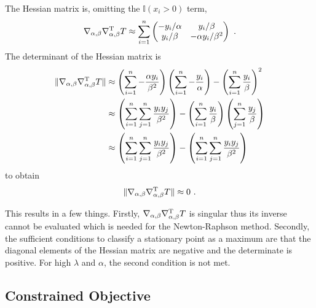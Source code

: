 The Hessian matrix is, omitting the $\mathbb{I}(x_i>0)$ term,
\begin{equation}
  \nabla_{\alpha,\beta}\nabla_{\alpha,\beta}^\textup{T} T \approx
  \sum_{i=1}^n
  \begin{pmatrix}
    -y_i/\alpha  & y_i/\beta \\
    y_i/\beta & -\alpha y_i/\beta^2
  \end{pmatrix}
  \ . 
\end{equation}
The determinant of the Hessian matrix is
\begin{align*}
  \|\nabla_{\alpha,\beta}\nabla_{\alpha,\beta}^\textup{T} T\|
  &\approx
  \left(\sum_{i=1}^n-\frac{\alpha y_i}{\beta^2}\right)
  \left(\sum_{i=1}^n-\frac{y_i}{\alpha}\right) - \left(\sum_{i=1}^n\frac{y_i}{\beta}\right)^2
  \\
  &\approx
  \left(\sum_{i=1}^n\sum_{j=1}^n\frac{y_iy_j}{\beta^2}\right)
   - \left(\sum_{i=1}^n\frac{y_i}{\beta}\right)\left(\sum_{j=1}^n\frac{y_j}{\beta}\right)
  \\
  &\approx
  \left(\sum_{i=1}^n\sum_{j=1}^n\frac{y_iy_j}{\beta^2}\right)
   - \left(\sum_{i=1}^n\sum_{j=1}^n\frac{y_iy_j}{\beta^2}\right)
\end{align*}
to obtain
\begin{equation}
  \|\nabla_{\alpha,\beta}\nabla_{\alpha,\beta}^\textup{T} T\|
  \approx
  0
  \ .
\end{equation}

This results in a few things. Firstly, $\nabla_{\alpha,\beta}\nabla_{\alpha,\beta}^\textup{T} T$ is singular thus its inverse cannot be evaluated which is needed for the Newton-Raphson method. Secondly, the sufficient conditions to classify a stationary point as a maximum are that the diagonal elements of the Hessian matrix are negative and the determinate is positive. For high $\lambda$ and $\alpha$, the second condition is not met.

\subsection{Constrained Objective}


